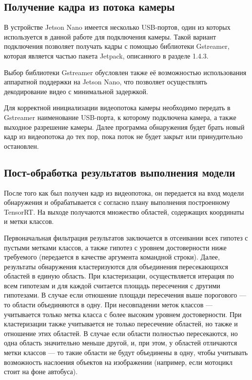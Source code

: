 \subsection{Получение кадра из потока камеры}

В устройстве Jetson Nano имеется несколько USB-портов, один из которых используется в данной работе для подключения камеры. Такой вариант подключения позволяет получать кадры с помощью библиотеки Gstreamer, которая является частью пакета Jetpack, описанного в разделе 1.4.3. 

Выбор библиотеки Gstreamer обусловлен также её возможностью использования аппаратной поддержки на Jetson Nano, что позволяет осуществлять декодирование видео с минимальной задержкой.

Для корректной инициализации видеопотока камеры необходимо передать в Gstreamer наименование USB-порта, к которому подключена камера, а также выходное разрешение камеры. Далее программа обнаружения будет брать новый кадр из видеопотока до тех пор, пока поток не будет закрыт или принудительно остановлен.

\subsection{Пост-обработка результатов выполнения модели}

После того как был получен кадр из видеопотока, он передается на вход модели обнаружения и обрабатывается с согласно плану выполнения построенному TensorRT. На выходе получаются множество областей, содержащих координаты и метки классов. 

Первоначальная фильтрация результатов заключается в отсеивании всех гипотез с пустыми метками классов, а также гипотез с уровнем достоверности ниже требуемого (передается в качестве аргумента командной строки). Далее, результаты обнаружения кластеризуются для объединения пересекающихся областей в единую область. При кластеризации, осуществляется итерация по всем гипотезам и для каждой считается площадь пересечения с другими гипотезами. В случае если отношение площади пересечения выше порогового — то области объединяются в одну. При несовпадении меток классов — учитывается только метка класса с более высоким уровнем достоверности. При кластеризации также учитывается не только пересечение областей, но также и отношение этих областей. В случае если области полностью пересекаются, но одна область значительно меньше другой, и, при этом, у областей отличаются метки классов — то такие области не будут объединены в одну, чтобы учитывать возможность наслоения объектов на изображении (например, если мотоцикл стоит на фоне автобуса).

